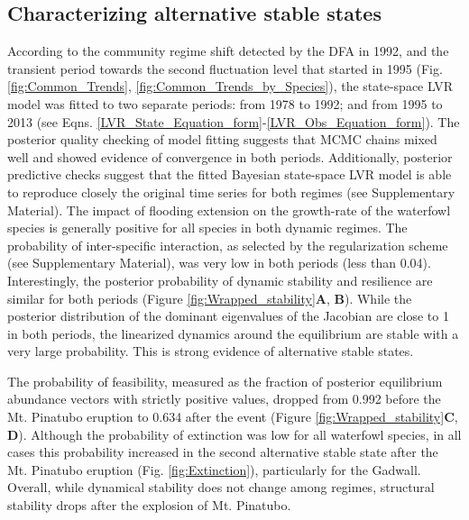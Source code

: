 \documentclass[12pt]{article}
\begin{document}
\subsection*{Characterizing alternative stable states}
\label{subsec:ASSRes}

According to the community regime shift detected by the DFA in 1992, and the transient period towards the second fluctuation level that started in 1995 (Fig. \ref{fig:Common_Trends}, \ref{fig:Common_Trends_by_Species}), the state-space LVR model was fitted to two separate periods: from 1978 to 1992; and from 1995 to 2013 (see Eqns. \ref{LVR_State_Equation_form}-\ref{LVR_Obs_Equation_form}). The posterior quality checking of model fitting suggests that MCMC chains mixed well and showed evidence of convergence in both periods. Additionally, posterior predictive checks suggest that the fitted Bayesian state-space LVR model is able to reproduce closely the original time series for both regimes (see Supplementary Material). The impact of flooding extension on the growth-rate of the waterfowl species is generally positive for all species in both dynamic regimes. The probability of inter-specific interaction, as selected by the regularization scheme (see Supplementary Material), was very low in both periods (less than 0.04). Interestingly, the posterior probability of dynamic stability and resilience are similar for both periods (Figure \ref{fig:Wrapped_stability}\textbf{A}, \textbf{B}). While the posterior distribution of the dominant eigenvalues of the Jacobian are close to 1 in both periods, the linearized dynamics around the equilibrium are stable with a very large probability. This is strong evidence of alternative stable states.

The probability of feasibility, measured as the fraction of posterior equilibrium abundance vectors with strictly positive values, dropped from 0.992 before the Mt. Pinatubo eruption to 0.634 after the event (Figure \ref{fig:Wrapped_stability}\textbf{C}, \textbf{D}). Although the probability of extinction was low for all waterfowl species, in all cases this probability increased in the second alternative stable state after the Mt. Pinatubo eruption (Fig. \ref{fig:Extinction}), particularly for the Gadwall. Overall, while dynamical stability does not change among regimes, structural stability drops after the explosion of Mt. Pinatubo.\\
\end{document}

